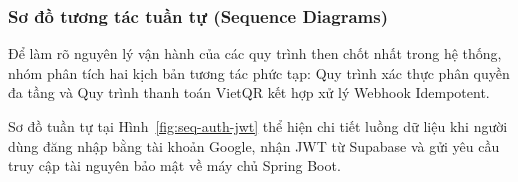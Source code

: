 \subsubsection{Sơ đồ tương tác tuần tự (Sequence Diagrams)}

Để làm rõ nguyên lý vận hành của các quy trình then chốt nhất trong hệ thống, nhóm phân tích hai kịch bản tương tác phức tạp: Quy trình xác thực phân quyền đa tầng và Quy trình thanh toán VietQR kết hợp xử lý Webhook Idempotent.


Sơ đồ tuần tự tại Hình~\ref{fig:seq-auth-jwt} thể hiện chi tiết luồng dữ liệu khi người dùng đăng nhập bằng tài khoản Google, nhận JWT từ Supabase và gửi yêu cầu truy cập tài nguyên bảo mật về máy chủ Spring Boot.

